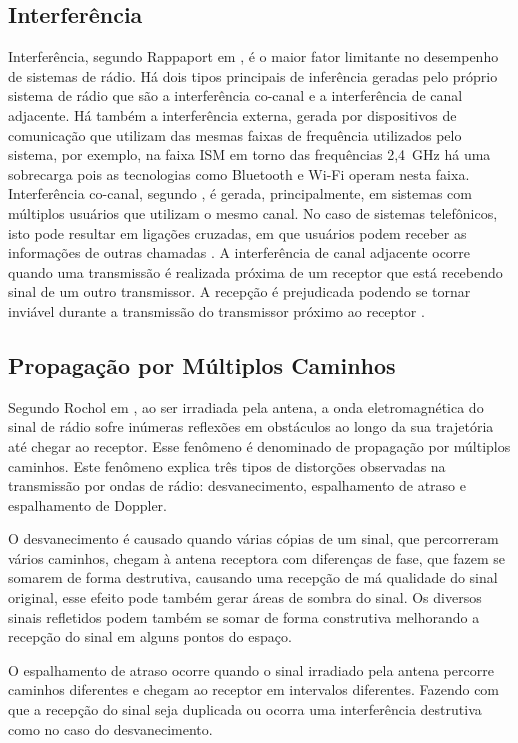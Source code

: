 \subsection{Interferência}
Interferência, segundo Rappaport em \cite{rappaport2009}, é o maior fator limitante no desempenho de sistemas de rádio. Há dois tipos principais de inferência geradas pelo próprio sistema de rádio que são a interferência co-canal e a interferência de canal adjacente. Há também a interferência externa, gerada por dispositivos de comunicação que utilizam das mesmas faixas de frequência utilizados pelo sistema, por exemplo, na faixa ISM em torno das frequências 2,4~GHz há uma sobrecarga pois as tecnologias como Bluetooth e Wi-Fi operam nesta faixa. Interferência co-canal, segundo \cite{rochol2018sistemas}, é gerada, principalmente, em sistemas com múltiplos usuários que utilizam o mesmo canal. No caso de sistemas telefônicos, isto pode resultar em ligações cruzadas, em que usuários podem receber as informações de outras chamadas \cite{rappaport2009}. A interferência de canal adjacente ocorre quando uma transmissão é realizada próxima de um receptor que está recebendo sinal de um outro transmissor. A recepção é prejudicada podendo se tornar inviável durante a transmissão do transmissor próximo ao receptor \cite{rappaport2009}.


\subsection{Propagação por Múltiplos Caminhos}
Segundo Rochol em \cite{rochol2018sistemas}, ao ser irradiada pela antena, a onda eletromagnética do sinal de rádio sofre inúmeras reflexões em obstáculos ao longo da sua trajetória até chegar ao receptor. Esse fenômeno é denominado de propagação por múltiplos caminhos. Este fenômeno explica três tipos de distorções observadas na transmissão por ondas de rádio: desvanecimento, espalhamento de atraso e espalhamento de Doppler.

O desvanecimento é causado quando várias cópias de um sinal, que percorreram vários caminhos, chegam à antena receptora com diferenças de fase, que fazem se somarem de forma destrutiva, causando uma recepção de má qualidade do sinal original, esse efeito pode também gerar áreas de sombra do sinal. Os diversos sinais refletidos podem também se somar de forma construtiva melhorando a recepção do sinal em alguns pontos do espaço.

O espalhamento de atraso ocorre quando o sinal irradiado pela antena percorre caminhos diferentes e chegam ao receptor em intervalos diferentes. Fazendo com que a recepção do sinal seja duplicada ou ocorra uma interferência destrutiva como no caso do desvanecimento.

